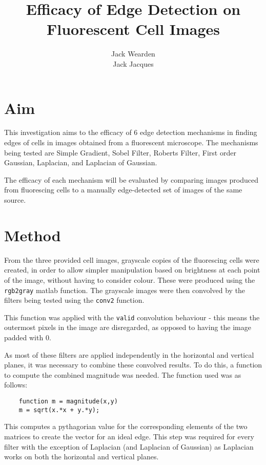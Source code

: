 \documentclass[12pt]{article}
\title{Efficacy of Edge Detection on Fluorescent Cell Images}
\date{}
\author{Jack Wearden\\Jack Jacques}
\begin{document}
  \maketitle
  \section{Aim}

  This investigation aims to the efficacy of 6 edge detection mechanisms in finding edges of cells in images obtained from a fluorescent microscope. The mechanisms being tested are Simple Gradient, Sobel Filter, Roberts Filter, First order Gaussian, Laplacian, and Laplacian of Gaussian.

  The efficacy of each mechanism will be evaluated by comparing images produced from fluorescing cells to a manually edge-detected set of images of the same source.

  \section{Method}

  From the three provided cell images, grayscale copies of the fluorescing cells were created, in order to allow simpler manipulation based on brightness at each point of the image, without having to consider colour. These were produced using the \texttt{rgb2gray} matlab function. The grayscale images were then convolved by the filters being tested using the \texttt{conv2} function.

  This function was applied with the \texttt{valid} convolution behaviour - this means the outermost pixels in the image are disregarded, as opposed to having the image padded with 0.

  As most of these filters are applied independently in the horizontal and vertical planes, it was necessary to combine these convolved results. To do this, a function to compute the combined magnitude was needed. The function used was as follows:

  \small\begin{verbatim}
    function m = magnitude(x,y)
    m = sqrt(x.*x + y.*y);
  \end{verbatim}

  This computes a pythagorian value for the corresponding elements of the two matrices to create the vector for an ideal edge. This step was required for every filter with the exception of Laplacian (and Laplacian of Gaussian) as Laplacian works on both the horizontal and vertical planes.
\end{document}
